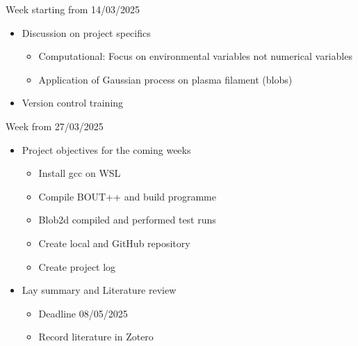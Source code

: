 \documentclass{article}
\begin{document}
\begin{arrowlist}
    \item Week starting from 14/03/2025
    \begin{itemize}
        \item Discussion on project specifics
        \begin{itemize}
        	\item Computational: Focus on environmental variables not numerical variables
        	\item Application of Gaussian process on plasma filament (blobs)
        \end{itemize}
        \item Version control training
    \end{itemize}
    
    \item Week from 27/03/2025
    \begin{itemize}
        \item Project objectives for the coming weeks
        \begin{itemize}
        	\item Install gcc on WSL
        	\item Compile BOUT++ and build programme
        	  \item Blob2d compiled and performed test runs
        	\item Create local and GitHub repository	
        	\item Create project log
        \end{itemize}
        \item Lay summary and Literature review
        \begin{itemize}
        	\item Deadline 08/05/2025
        	\item  Record literature in Zotero
        \end{itemize}
    \end{itemize}
    

\end{arrowlist}
\end{document}
